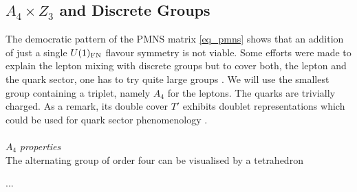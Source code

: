 
\subsection{$A_4\times Z_3$ and Discrete Groups}
\label{sec_A4GT}
The democratic pattern of the PMNS matrix \eqref{eq_pmns} shows that an addition of just a single $U(1)_\text{FN}$ flavour symmetry is not viable. Some efforts
were made to explain the lepton mixing with discrete groups but to cover both, the lepton and the quark sector, one has to try quite large groups
\cite{1605.03581}. We will use the smallest group containing a triplet, namely $A_4$ for the leptons. The quarks are trivially charged.
As a remark, its double cover $T'$ exhibits doublet representations which could be used for quark sector phenomenology \cite{Tprime}. 
\\ \\ $A_4$\textit{ properties}\\
\noindent The alternating group of order four can be visualised by a tetrahedron


...


